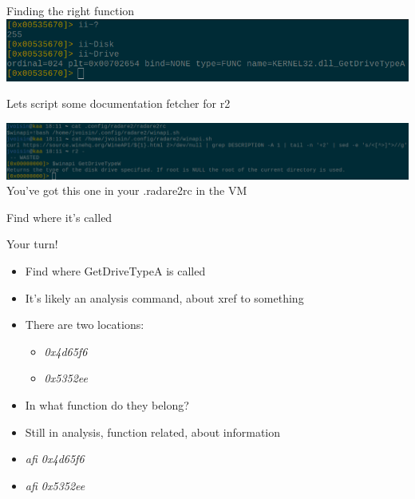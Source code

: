 \documentclass{beamer}
\begin{document}

\begin{frame}{Finding the right function}
	\includegraphics[width=\textwidth]{ii.png}\\
\end{frame}

\begin{frame}{Lets script some documentation fetcher for r2}
	\begin{center}
		\includegraphics[width=\textwidth,height=.3\textheight]{script.png}\\
		\pause
		You've got this one in your .radare2rc in the VM
	\end{center}
\end{frame}

\begin{frame}{Find where it's called}
	\begin{block}{Your turn!}
		\begin{itemize}[<+->]
			\item Find where \alert{GetDriveTypeA} is called
			\item It's likely an \alert{a}nalysis command, about \alert{x}ref \alert{t}o something
			\item There are two locations:
				\begin{itemize}
					\item \emph{0x4d65f6}
					\item \emph{0x5352ee}
				\end{itemize}
			\item In what function do they belong?
			\item Still in \alert{a}nalysis, \alert{f}unction related, about \alert{i}nformation
			\item \emph{afi 0x4d65f6}
			\item \emph{afi 0x5352ee}
		\end{itemize}
	\end{block}
\end{frame}
\end{document}
